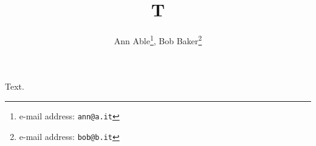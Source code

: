 \documentclass{iopart}
\begin{document}
\title{T}
\author{Ann Able\dag\footnote[1]{e-mail address: \texttt{ann@a.it}},
Bob Baker\ddag\footnote[5]{e-mail address: \texttt{bob@b.it}}}
\address{\dag\ Sezione INFN A,\\ City A}
\address{\ddag\ Department of Physics,\\ Univ B, City B}
Text.
\end{document}
